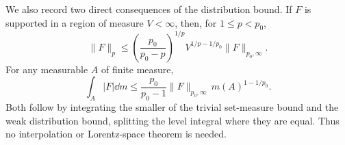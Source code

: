 We also record two direct consequences of the distribution bound. If
\(F\) is supported in a region of measure \(V<\infty\), then, for
\(1\le p<p_0\),
\begin{equation}\label{subquad:strong-from-weak}
 \|F\|_p\le\left(\frac{p_0}{p_0-p}\right)^{1/p}
 V^{1/p-1/p_0}\|F\|_{p_0,\infty}.
\end{equation}
For any measurable \(A\) of finite measure,
\begin{equation}\label{subquad:restricted-set}
 \int_A|F|\dd m\le\frac{p_0}{p_0-1}
 \|F\|_{p_0,\infty}\,m(A)^{1-1/p_0}.
\end{equation}
Both follow by integrating the smaller of the trivial set-measure bound
and the weak distribution bound, splitting the level integral where they
are equal. Thus no interpolation or Lorentz-space theorem is needed.

